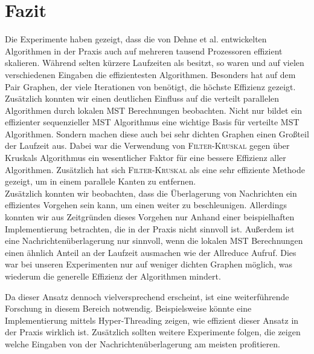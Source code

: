 \section{Fazit}\label{Fazit}

Die Experimente haben gezeigt, dass die von Dehne et al. \cite{dehne1998practical} entwickelten Algorithmen in der Praxis auch auf mehreren tausend Prozessoren effizient skalieren. Während \mergeMST selten kürzere Laufzeiten als \boruvkaAllreduce besitzt, so waren \boruvkaMixedMerge und \boruvkaThenMerge auf vielen verschiedenen Eingaben die effizientesten Algorithmen. 
Besonders \boruvkaMixedMerge hat auf dem Pair Graphen, der viele Iterationen von \boruvkaAllreduce benötigt, die höchste Effizienz gezeigt. \\
Zusätzlich konnten wir einen deutlichen Einfluss auf die verteilt parallelen Algorithmen durch lokalen MST Berechnungen beobachten. Nicht nur bildet ein effizienter sequenzieller MST Algorithmus eine wichtige Basis für verteilte MST Algorithmen. Sondern machen diese auch bei sehr dichten Graphen einen Großteil der Laufzeit aus. Dabei war die Verwendung von \textsc{Filter-Kruskal} gegen über Kruskals Algorithmus ein wesentlicher Faktor für eine bessere Effizienz aller Algorithmen. Zusätzlich hat sich \textsc{Filter-Kruskal} als eine sehr effiziente Methode gezeigt, um in einem \boruvkaStep parallele Kanten zu entfernen.\\
Zusätzlich konnten wir beobachten, dass die Überlagerung von Nachrichten ein effizientes Vorgehen sein kann, um einen \boruvkaStep weiter zu beschleunigen.
Allerdings konnten wir aus Zeitgründen dieses Vorgehen nur Anhand einer beispielhaften Implementierung betrachten, die in der Praxis nicht sinnvoll ist.
Außerdem ist eine Nachrichtenüberlagerung nur sinnvoll, wenn die lokalen MST Berechnungen einen ähnlich Anteil an der Laufzeit ausmachen wie der Allreduce Aufruf. Dies war bei unseren Experimenten nur auf weniger dichten Graphen möglich, was wiederum die generelle Effizienz der Algorithmen mindert.


Da dieser Ansatz dennoch vielversprechend erscheint, ist eine weiterführende Forschung in diesem Bereich notwendig.
Beispielsweise könnte eine Implementierung mittels Hyper-Threading zeigen, wie effizient dieser Ansatz in der Praxis wirklich ist.
Zusätzlich sollten weitere Experimente folgen, die zeigen welche Eingaben von der Nachrichtenüberlagerung am meisten profitieren.
